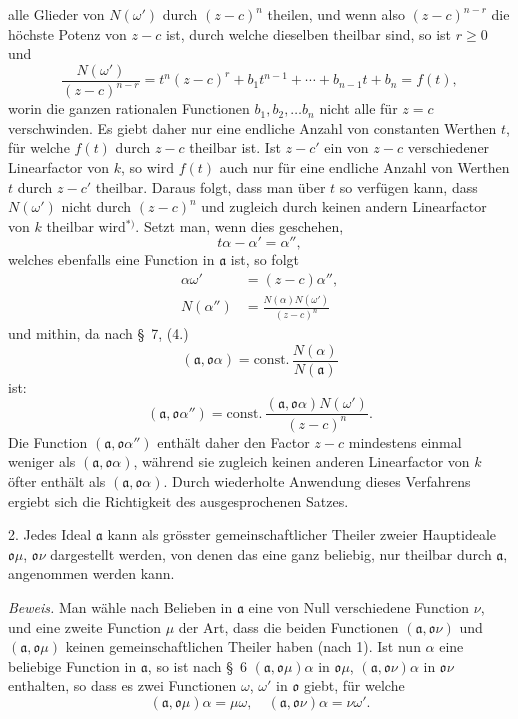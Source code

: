 \documentclass{article}
\begin{document}
alle Glieder von $N(\omega')$ durch $(z-c)^{n}$ theilen, und wenn also $(z-c)^{n-r}$ die höchste Potenz von $z-c$ ist, durch welche dieselben theilbar sind, so ist $r \geqslant 0$ und
\[ \frac{N(\omega')}{(z-c)^{n-r}} = t^{n}(z-c)^{r} + b_{1}t^{n-1} + \cdots + b_{n-1}t + b_{n} = f(t), \]
worin die ganzen rationalen Functionen $b_{1}, b_{2}, \ldots b_{n}$ nicht alle für $z = c$ verschwinden. Es giebt daher nur eine endliche Anzahl von constanten Werthen $t$, für welche $f(t)$ durch $z-c$ theilbar ist. Ist $z-c'$ ein von $z-c$ verschiedener Linearfactor von $k$, so wird $f(t)$ auch nur für eine endliche Anzahl von Werthen $t$ durch $z-c'$ theilbar. Daraus folgt, dass man über $t$ so verfügen kann, dass $N(\omega')$ nicht durch $(z-c)^{n}$ und zugleich durch keinen andern Linearfactor von $k$ theilbar wird${}^{*)}$. Setzt man, wenn dies geschehen,
\[ t\alpha - \alpha' = \alpha'', \]
welches ebenfalls eine Function in $\mathfrak{a}$ ist, so folgt
\[ \begin{aligned} \alpha\omega' &= (z-c)\alpha'', \\ N(\alpha'') &= \frac{N(\alpha)N(\omega')}{(z-c)^{n}} \end{aligned} \]
und mithin, da nach §~7, (4.)
\[ (\mathfrak{a}, \mathfrak{o}\alpha) = \text{const.}\,\frac{N(\alpha)}{N(\mathfrak{a})} \]
ist:
\[ (\mathfrak{a}, \mathfrak{o}\alpha'') = \text{const.}\,\frac{(\mathfrak{a}, \mathfrak{o}\alpha)N(\omega')}{(z-c)^{n}}. \]
Die Function $(\mathfrak{a}, \mathfrak{o}\alpha'')$ enthält daher den Factor $z-c$ mindestens einmal weniger als $(\mathfrak{a}, \mathfrak{o}\alpha)$, während sie zugleich keinen anderen Linearfactor von $k$ öfter enthält als $(\mathfrak{a}, \mathfrak{o}\alpha)$. Durch wiederholte Anwendung dieses Verfahrens ergiebt sich die Richtigkeit des ausgesprochenen Satzes.

2. Jedes Ideal $\mathfrak{a}$ kann als grösster gemeinschaftlicher Theiler zweier Hauptideale $\mathfrak{o}\mu$, $\mathfrak{o}\nu$ dargestellt werden, von denen das eine ganz beliebig, nur theilbar durch $\mathfrak{a}$, angenommen werden kann.

\emph{Beweis.} Man wähle nach Belieben in $\mathfrak{a}$ eine von Null verschiedene Function $\nu$, und eine zweite Function $\mu$ der Art, dass die beiden Functionen $(\mathfrak{a}, \mathfrak{o}\nu)$ und $(\mathfrak{a}, \mathfrak{o}\mu)$ keinen gemeinschaftlichen Theiler haben (nach 1). Ist nun $\alpha$ eine beliebige Function in $\mathfrak{a}$, so ist nach §~6 $(\mathfrak{a}, \mathfrak{o}\mu)\alpha$ in $\mathfrak{o}\mu$, $(\mathfrak{a}, \mathfrak{o}\nu)\alpha$ in $\mathfrak{o}\nu$ enthalten, so dass es zwei Functionen $\omega$, $\omega'$ in $\mathfrak{o}$ giebt, für welche
\[ (\mathfrak{a}, \mathfrak{o}\mu)\alpha = \mu\omega, \quad (\mathfrak{a}, \mathfrak{o}\nu)\alpha = \nu\omega'. \]
\end{document}
